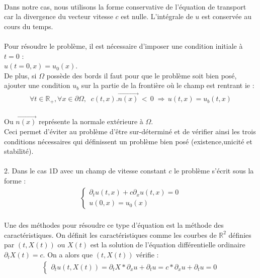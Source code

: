 \documentclass[12pt]{article}
\begin{document}
\\Dans notre cas, nous utilisons la forme conservative de l'équation de transport car la divergence du vecteur vitesse $c$ est nulle. L'intégrale de $u$  est conservée au cours du temps. 
\\
\\Pour résoudre le problème, il est nécessaire d'imposer une condition initiale à $t=0$ : \\$u(t=0,x)=u_0(x)$.
\\De plus, si $\Omega$ possède des bords il faut pour que le problème soit bien posé, ajouter une condition $u_{b}$ sur la partie de la frontière où le champ est rentrant ie :
\\
\begin{eqnarray}
\forall t\in \mathbb{R}_{+}, \forall x\in \partial\Omega,\;\;c(t,x).\overrightarrow{n(x)}\,<\,0\; \Rightarrow\, u(t,x) = u_b(t,x)
\end{eqnarray}
\\
Ou $\overrightarrow{n(x)}$ représente la normale extérieure à $\Omega$.
\\Ceci permet d'éviter au problème d'être sur-déterminé et de vérifier ainsi les trois conditions nécessaires qui définissent un problème bien posé (existence,unicité et stabilité).
\\ 
\\2. Dans le cas 1D avec un champ de vitesse constant $c$ le problème s'écrit sous la forme :
\begin{eqnarray}
    \left\{ 
    \begin{array}{llll}
        \partial_tu(t,x) + c\partial_xu(t,x)=0
        \\u(0,x)=u_0(x)
        \end{array}
    \right .
\end{eqnarray}
\\
Une des méthodes pour résoudre ce type d'équation est la méthode des caractéristiques. On définit les caractéristiques comme les courbes de $\mathbb{R}^2$ définies par $(t,X(t))$ ou $X(t)$ est la solution de l'équation différentielle ordinaire $\partial_tX(t)=c$.
On a alors que $(t,X(t))$ vérifie :
\\
\begin{eqnarray}
   \left\{ 
    \begin{array}{llll}
        \partial_tu(t,X(t))=\partial_tX*\partial_xu+\partial_tu
        =c*\partial_xu+\partial_tu =0
        \end{array}
    \right .
\end{eqnarray}
\end{document}
